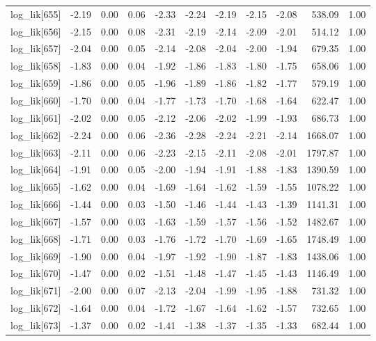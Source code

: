 \begin{table}[ht]
\begin{tabular}{rrrrrrrrrrr}
  log\_lik[655] & -2.19 & 0.00 & 0.06 & -2.33 & -2.24 & -2.19 & -2.15 & -2.08 & 538.09 & 1.00 \\ 
  log\_lik[656] & -2.15 & 0.00 & 0.08 & -2.31 & -2.19 & -2.14 & -2.09 & -2.01 & 514.12 & 1.00 \\ 
  log\_lik[657] & -2.04 & 0.00 & 0.05 & -2.14 & -2.08 & -2.04 & -2.00 & -1.94 & 679.35 & 1.00 \\ 
  log\_lik[658] & -1.83 & 0.00 & 0.04 & -1.92 & -1.86 & -1.83 & -1.80 & -1.75 & 658.06 & 1.00 \\ 
  log\_lik[659] & -1.86 & 0.00 & 0.05 & -1.96 & -1.89 & -1.86 & -1.82 & -1.77 & 579.19 & 1.00 \\ 
  log\_lik[660] & -1.70 & 0.00 & 0.04 & -1.77 & -1.73 & -1.70 & -1.68 & -1.64 & 622.47 & 1.00 \\ 
  log\_lik[661] & -2.02 & 0.00 & 0.05 & -2.12 & -2.06 & -2.02 & -1.99 & -1.93 & 686.73 & 1.00 \\ 
  log\_lik[662] & -2.24 & 0.00 & 0.06 & -2.36 & -2.28 & -2.24 & -2.21 & -2.14 & 1668.07 & 1.00 \\ 
  log\_lik[663] & -2.11 & 0.00 & 0.06 & -2.23 & -2.15 & -2.11 & -2.08 & -2.01 & 1797.87 & 1.00 \\ 
  log\_lik[664] & -1.91 & 0.00 & 0.05 & -2.00 & -1.94 & -1.91 & -1.88 & -1.83 & 1390.59 & 1.00 \\ 
  log\_lik[665] & -1.62 & 0.00 & 0.04 & -1.69 & -1.64 & -1.62 & -1.59 & -1.55 & 1078.22 & 1.00 \\ 
  log\_lik[666] & -1.44 & 0.00 & 0.03 & -1.50 & -1.46 & -1.44 & -1.43 & -1.39 & 1141.31 & 1.00 \\ 
  log\_lik[667] & -1.57 & 0.00 & 0.03 & -1.63 & -1.59 & -1.57 & -1.56 & -1.52 & 1482.67 & 1.00 \\ 
  log\_lik[668] & -1.71 & 0.00 & 0.03 & -1.76 & -1.72 & -1.70 & -1.69 & -1.65 & 1748.49 & 1.00 \\ 
  log\_lik[669] & -1.90 & 0.00 & 0.04 & -1.97 & -1.92 & -1.90 & -1.87 & -1.83 & 1438.06 & 1.00 \\ 
  log\_lik[670] & -1.47 & 0.00 & 0.02 & -1.51 & -1.48 & -1.47 & -1.45 & -1.43 & 1146.49 & 1.00 \\ 
  log\_lik[671] & -2.00 & 0.00 & 0.07 & -2.13 & -2.04 & -1.99 & -1.95 & -1.88 & 731.32 & 1.00 \\ 
  log\_lik[672] & -1.64 & 0.00 & 0.04 & -1.72 & -1.67 & -1.64 & -1.62 & -1.57 & 732.65 & 1.00 \\ 
  log\_lik[673] & -1.37 & 0.00 & 0.02 & -1.41 & -1.38 & -1.37 & -1.35 & -1.33 & 682.44 & 1.00 \\ 

\end{tabular}
\end{table}

